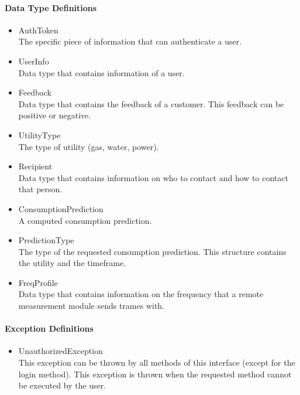 \paragraph{Data Type Definitions}
\begin{itemize}
	\item AuthToken\\
	The specific piece of information that can authenticate a user.
	\item UserInfo\\
	Data type that contains information of a user.
	\item Feedback\\
	Data type that contains the feedback of a customer. This feedback can be positive or negative.
	\item UtilityType\\
	The type of utility (gas, water, power).
	\item Recipient\\
	Data type that contains information on who to contact and how to contact that person.
	\item ConsumptionPrediction\\
	A computed consumption prediction.
	\item PredictionType\\
	The type of the requested consumption prediction. This structure contains the utility
		and the timeframe.
	\item FreqProfile\\
	Data type that contains information on the frequency that a remote measurement module sends trames with.
\end{itemize}
\paragraph{Exception Definitions}
\begin{itemize}
	\item UnauthorizedException\\
	This exception can be thrown by all methods of this interface (except for the login method). This exception
		is thrown when the requested method cannot be executed by the user.
\end{itemize}